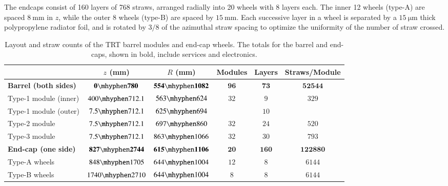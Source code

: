 The endcaps consist of 160 layers of 768 straws, arranged radially into 20 wheels with 8 layers each. The inner 12 wheels (type-A) are spaced $\SI{8}{\milli\meter}$ in $z$, while the outer 8 wheels (type-B) are spaced by $\SI{15}{\milli\meter}$. Each successive layer in a wheel is separated by a $\SI{15}{\micro\meter}$ thick polypropylene radiator foil, and is rotated by $3/8$ of the azimuthal straw spacing to optimize the uniformity of the number of straw crossed.


\begin{table}[htbp]
	\centering
	\begin{tabular}{|l|c|c|c|c|c|}
		\hline
		 & $z$ (mm) & $R$ (mm) & Modules & Layers & Straws/Module \\
		 \hline
		 \textbf{Barrel (both sides)} & $\mathbf{0\mhyphen780}$ & $\mathbf{554\mhyphen1082}$ & $\mathbf{96}$ & $\mathbf{73}$ & $\mathbf{52544}$ \\
		 Type-1 module (inner) & $400\mhyphen712.1$ & $563\mhyphen624$ & \multirow{2}{*}{$32$} & $9$ & \multirow{2}{*}{$329$} \\
		 Type-1 module (outer) & $7.5\mhyphen712.1$ & $625\mhyphen 694$ & & $10$ & \\
		 Type-2 module & $7.5\mhyphen 712.1$ & $697\mhyphen860$ & $32$ & $24$ & $520$ \\
		 Type-3 module & $7.5\mhyphen 712.1$ & $863\mhyphen 1066$ & $32$ & $30$ & $793$ \\
		 \hline
		 \textbf{End-cap (one side)} & $\mathbf{827\mhyphen 2744}$ & $\mathbf{615\mhyphen1106}$ & $\mathbf{20}$ & $\mathbf{160}$ & $\mathbf{122880}$ \\
		 Type-A wheels & $848\mhyphen1705$ & $644\mhyphen1004$ & $12$ & $8$ & $6144$ \\
		 Type-B wheels & $1740\mhyphen2710$ & $644\mhyphen1004$ & $8$ & $8$ & $6144$ \\
		 \hline
	\end{tabular}
	\caption{Layout and straw counts of the TRT barrel modules and end-cap wheels. The totals for the barrel and end-caps, shown in bold, include services and electronics.}	
	\label{table:ATLAS-TRT-layout}
\end{table}



